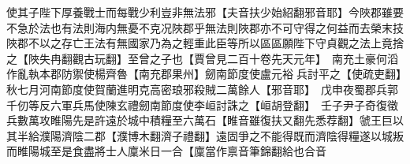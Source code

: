 使其子陛下厚養戰士而每戰少利豈非無法邪【夫音扶少始紹翻邪音耶】今陜郡雖要不急於法也有法則海内無憂不克况陜郡乎無法則陜郡亦不可守得之何益而去榮末技陜郡不以之存亡王法有無國家乃為之輕重此臣等所以區區願陛下守貞觀之法上竟捨之【陜失冉翻觀古玩翻】至曾之子也【賈曾見二百十卷先天元年】　南充土豪何滔作亂執本郡防禦使楊齊魯【南充郡果州】劒南節度使盧元裕兵討平之【使疏吏翻】　秋七月河南節度使賀蘭進明克高密琅邪殺賊二萬餘人【邪音耶】　戊申夜蜀郡兵郭千仞等反六軍兵馬使陳玄禮劒南節度使李峘討誅之【峘胡登翻】　壬子尹子奇復徵兵數萬攻睢陽先是許遠於城中積糧至六萬石【睢音雖復扶又翻先悉荐翻】虢王巨以其半給濮陽濟陰二郡【濮博木翻濟子禮翻】遠固爭之不能得既而濟陰得糧遂以城叛而睢陽城至是食盡將士人廩米日一合【廩當作禀音筆錦翻給也合音